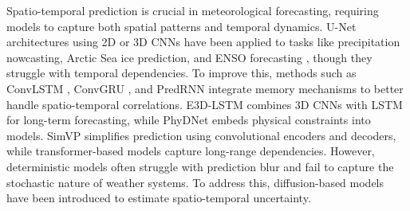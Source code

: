 Spatio-temporal prediction is crucial in meteorological forecasting, requiring models to capture both spatial patterns and temporal dynamics. U-Net architectures using 2D or 3D CNNs have been applied to tasks like precipitation nowcasting, Arctic Sea ice prediction, and ENSO forecasting \cite{sevir, sea-ice, enos}, though they struggle with temporal dependencies. To improve this, methods such as ConvLSTM \cite{convlstm}, ConvGRU \cite{convgru}, and PredRNN \cite{predrnn, predrnnv2} integrate memory mechanisms to better handle spatio-temporal correlations. E3D-LSTM \cite{e3d} combines 3D CNNs with LSTM for long-term forecasting, while PhyDNet \cite{phydnet} embeds physical constraints into models. SimVP \cite{simvp} simplifies prediction using convolutional encoders and decoders, while transformer-based models \cite{fourcastnet, rainformer, earthformer} capture long-range dependencies. However, deterministic models often struggle with prediction blur and fail to capture the stochastic nature of weather systems. To address this, diffusion-based models \cite{prediff, diffcast} have been introduced to estimate spatio-temporal uncertainty.